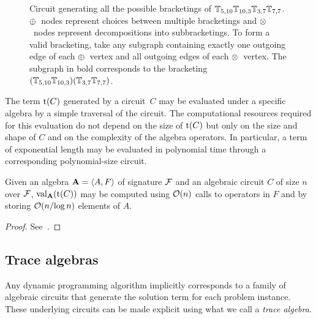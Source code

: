 \begin{figure}[h]
    \caption[Algebraic circuit generating the matrix chain multiplication solution space]{
        Circuit generating all the possible bracketings of \(\mathbb{T}_{5,10}\mathbb{T}_{10,3}\mathbb{T}_{3,7}\mathbb{T}_{7,7}\).
        \(\mathbin{\oplus}\)~nodes represent choices between multiple bracketings
        and \(\mathbin{\otimes}\)~nodes represent decompositions into subbracketings.
        To form a valid bracketing, take any subgraph containing exactly one outgoing edge of each \(\mathbin{\oplus}\)~vertex and all outgoing edges of each \(\mathbin{\otimes}\)~vertex.
        The subgraph in bold corresponds to the bracketing \((\mathbb{T}_{5,10}\mathbb{T}_{10,3})(\mathbb{T}_{3,7}\mathbb{T}_{7,7})\).
        \label{fig:circuit-matrix-mult}
    }
\end{figure}

The term \(\operatorname{t}(C)\) generated by a circuit~\(C\) may be evaluated under a specific algebra by a simple traversal of the circuit.
The computational resources required for this evaluation do not depend on the size of \(\operatorname{t}(C)\) but only on the size and shape of \(C\) and on the complexity of the algebra operators.
In particular, a term of exponential length may be evaluated in polynomial time through a corresponding polynomial-size circuit.

\begin{lemma}\label{lem:algebraic-circuit-eval}
    Given an algebra \(\mathbf{A} = \left\langle A, F\right\rangle\) of signature \(\mathcal{F}\)
    and an algebraic circuit \(C\)\! of size \(n\) over \(\mathcal{F}\),
    \(\operatorname{val}_{\mathbf{A}}(\operatorname{t}(C))\) may be computed
    using \(\operatorname{\mathcal{O}}(n)\) calls to operators in \(F\) and by storing \(\operatorname{\mathcal{O}}(n / {\log n})\) elements of \(A\).
\end{lemma}
\begin{proof}
    See~\textcite[§10.7]{Savage2008ModelsOfComputation}.
\end{proof}

\subsection{Trace algebras}\label{sec:adp:solution-spaces:trace}

Any dynamic programming algorithm implicitly corresponds to a family of algebraic circuits that generate the solution term for each problem instance.
These underlying circuits can be made explicit using what we call a \emph{trace algebra}.


